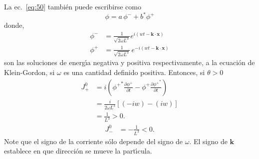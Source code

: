La ec.~\eqref{eq:50} tambi\'en puede escribirse como
\begin{equation}
  \phi=a\,\phi^-+b^*\phi^+
\end{equation}
donde, 
\begin{align}
\label{eq:246}
  \phi^-&=\frac{1}{\sqrt{2\omega L^3}}e^{i(wt-\mathbf{k}\cdot\mathbf{x})}\nonumber\\
  \phi^+&=\frac{1}{\sqrt{2\omega L^3}}\, e^{-i(wt-\mathbf{k}\cdot\mathbf{x})}
\end{align}
son las soluciones de energ\'\i a negativa y positiva respectivamente, a la ecuaci\'on de Klein-Gordon, si
 $\omega$ es una cantidad definido positiva. Entonces, si $\theta\gt 0$
\begin{align}
  J^0_+&=i({\phi^+}^*\frac{\partial\phi^+}{\partial t}-\phi^+\frac{\partial{\phi^+}^*}{\partial t})\nonumber\\
  &=\frac{i}{2\omega L^3}[(-iw)-(iw)]\nonumber\\
  \label{eq:61}
  &=\frac{1}{L^3}\gt 0.
\end{align}
\begin{align}
  J^0_-&=-\frac{1}{L^3}\lt 0.
\end{align}
Note que el signo de la corriente s\'olo depende del signo de $\omega$. El signo de $\mathbf{k}$ establece en que direcci\'on se mueve la part\'\i cula.

